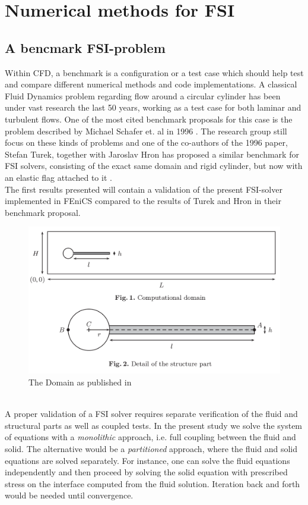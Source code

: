 \chapter{Numerical methods for FSI}

\section{A bencmark FSI-problem}

Within CFD, a benchmark is a configuration or a test case which should help test and compare different numerical methods and code implementations. A classical Fluid Dynamics problem regarding flow around a circular cylinder has been under vast research the last 50 years, working as a test case for both laminar and turbulent flows. One of the most cited benchmark proposals for this case is the problem described by Michael Schafer et. al in 1996 \cite{Scha96}. The research group still focus on these kinds of problems and one of the co-authors of the 1996 paper, Stefan Turek, together with Jaroslav Hron has proposed a similar benchmark for FSI solvers, consisting of the exact same domain and rigid cylinder, but now with an elastic flag attached to it \cite{Ture06}. 
\\ The first results presented will contain a validation of the present FSI-solver implemented in FEniCS compared to the results of Turek and Hron in their benchmark proposal. 
\begin{figure}
\includegraphics[scale=0.3]{figures/Hron_Turek_geometry}
\caption{The Domain as published in \cite{Ture06}}
\label{fig:Geometry}
\end{figure}
\\
A proper validation of a FSI solver requires separate verification of the fluid and structural parts as well as coupled tests. In the present study we solve the system of equations with a \textit{monolithic} approach, i.e. full coupling between the fluid and solid. The alternative would be a \textit{partitioned} approach, where the fluid and solid equations are solved separately. For instance, one can solve the fluid equations independently and then proceed by solving the solid equation with prescribed stress on the interface computed from the fluid solution. Iteration back and forth would be needed until convergence. \\
